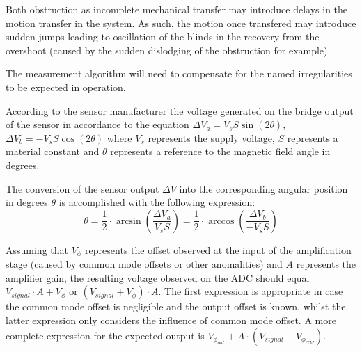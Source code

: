 \documentclass[]{article}
\begin{document}
Both obstruction as incomplete mechanical transfer may introduce delays in the
motion transfer in the system. As such, the motion once transfered may 
introduce sudden jumps leading to oscillation of the blinds in the recovery
from the overshoot (caused by the sudden dislodging of the obstruction for
example).

The measurement algorithm will need to compensate for the named irregularities
to be expected in operation.


According to the sensor manufacturer the voltage generated on the bridge output
of the sensor in accordance to the equation $\Delta{V_a} = V_s S\sin(2\theta)$,
$\Delta{V_b} = -V_s S\cos(2\theta)$ where $V_s$ represents the supply voltage, 
$S$ represents a material constant and $\theta$ represents a reference to the 
magnetic field angle in degrees.

The conversion of the sensor output $\Delta{V}$ into the corresponding angular 
position in degrees $\theta$ is accomplished with the following expression:
$$\theta = \frac{1}{2}\cdot\arcsin(\frac{\Delta{V_a}}{V_s S}) = \frac{1}{2}\cdot\arccos(\frac{\Delta{V_b}}{-V_s S})$$

Assuming that $V_\phi$ represents the offset observed at the input of the 
amplification stage (caused by common mode offsets or other anomalities)
and $A$ represents the amplifier gain, the resulting voltage observed on the
ADC should equal $V_{signal}\cdot A + V_\phi$ or $(V_{signal}+V_\phi)\cdot A$.
The first expression is appropriate in case the common mode offset is 
negligible and the output offset is known, whilst the latter expression only
considers the influence of common mode offset. A more complete expression for 
the expected output is $V_{\phi_{out}} + A\cdot(V_{signal}+V_{\phi_{CM}})$.
\end{document}
